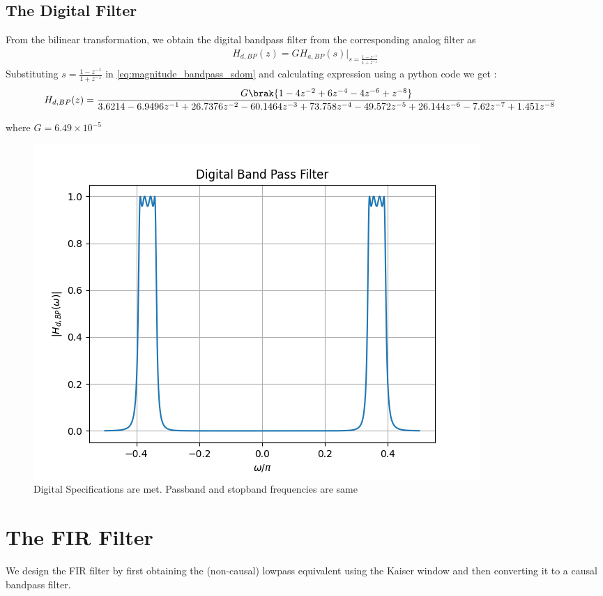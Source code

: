 \documentclass{article}
\begin{document}
\subsection{The Digital Filter}
From the bilinear transformation, we obtain the digital bandpass filter from the corresponding analog filter as
\begin{align}
    H_{d,BP}(z) = GH_{a,BP}(s)\vert_{s = \frac{1-z^{-1}}{1 + z^{-1}}}
\end{align}
Substituting $s=\frac{1-z^{-1}}{1+z^{-1}}$ in \eqref{eq:magnitude_bandpass_sdom} and calculating expression using a python code we get :
\begin{align}
    H_{d,BP}(z) &= \frac{G\brak{1 - 4z^{-2} + 6z^{-4} - 4z^{-6} + z^{-8}}}{3.6214 - 6.9496z^{-1} + 26.7376z^{-2} - 60.1464z^{-3} + 73.758z^{-4} - 49.572z^{-5} + 26.144z^{-6} - 7.62z^{-7} + 1.451z^{-8}}
\end{align}

where $G=6.49\times 10^{-5}$    
\begin{figure}[H]
\centering
\includegraphics[width=1\columnwidth]{figs/Digital_BPF.png}
\caption{Digital Specifications are met. Passband and stopband frequencies are same}
\label{fig:Digital_BPF}
\end{figure}

\section{The FIR Filter}
We design the FIR filter by first obtaining the (non-causal) lowpass equivalent using the Kaiser window
and then
converting it to a causal bandpass filter.
\end{document}
